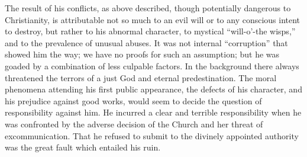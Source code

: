The result of his conflicts, as above described, though potentially
dangerous to Christianity, is attributable not so much to an evil will
or to any conscious intent to destroy, but rather to his abnormal character,
to mystical “will-o’-the wisps,” and to the prevalence of unusual
abuses. It was not internal “corruption” that showed him the way;
we have no proofs for such an assumption; but he was goaded by a
combination of less culpable factors. In the background there always
threatened the terrors of a just God and eternal predestination. The
moral phenomena attending his first public appearance, the defects of
his character, and his prejudice against good works, would seem to
decide the question of responsibility against him. He incurred a clear
and terrible responsibility when he was confronted by the adverse decision
of the Church and her threat of excommunication. That he
refused to submit to the divinely appointed authority was the great
fault which entailed his ruin.
